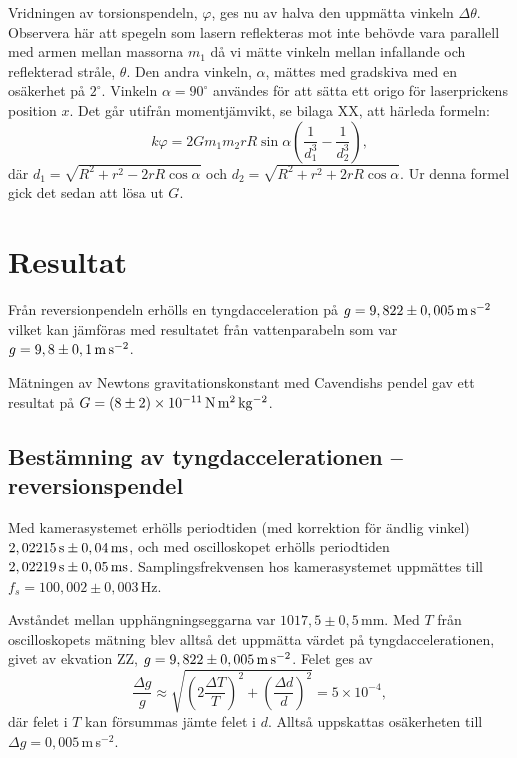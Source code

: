 \documentclass[11pt,a4paper]{article}
\begin{document}
Vridningen av torsionspendeln, $\varphi$, ges nu av halva den uppmätta vinkeln $\Delta \theta$. Observera här att spegeln som lasern reflekteras mot inte behövde vara parallell med armen mellan massorna $m_1$ då vi mätte vinkeln mellan infallande och reflekterad stråle, $\theta$. Den andra vinkeln, $\alpha$, mättes med gradskiva med en osäkerhet på $2^\circ$. Vinkeln $\alpha=90^\circ$ användes för att sätta ett origo för laserprickens position $x$. Det går utifrån momentjämvikt, se bilaga XX, att härleda formeln:
\begin{equation}
k \varphi = 2G m_1 m_2 rR\sin\alpha \left(\frac{1}{d_1^3}-\frac{1}{d_2^3} \right),
\label{eq:Gformel}
\end{equation}
där $d_1=\sqrt{R^2+r^2-2rR\cos\alpha}$ och $d_2=\sqrt{R^2+r^2+2rR\cos\alpha}$. Ur denna formel gick det sedan att lösa ut $G$. 


\section{Resultat}
Från reversionpendeln erhölls en tyngdacceleration på $g=\unit[9,822\pm0,005]{m\,s^{-2}}$ vilket kan jämföras med resultatet från vattenparabeln som var $g=\unit[9,8\pm 0,1]{m\,s^{-2}}$.

Mätningen av Newtons gravitationskonstant med Cavendishs pendel gav ett resultat på 
$G=\unit[(8\pm 2)\times 10^{-11}]{N\,m^2\,kg^{-2}}$.

\subsection{Bestämning av tyngdaccelerationen -- reversionspendel}

Med kamerasystemet erhölls periodtiden (med korrektion för ändlig vinkel) $\unit[2,02215]{s}\pm\unit[0,04]{ms}$, och med oscilloskopet erhölls periodtiden $\unit[2,02219]{s}\pm\unit[0,05]{ms}$.
Samplingsfrekvensen hos kamerasystemet uppmättes till $f_s=100,002\pm0,003$\,Hz.

Avståndet mellan upphängningseggarna var $1017,5\pm 0,5$\,mm. Med $T$ från oscilloskopets mätning blev alltså det uppmätta värdet på tyngdaccelerationen, givet av ekvation ZZ,
$g=\unit[9,822\pm0,005]{m\,s^{-2}}$. Felet ges av
\[ \frac{\Delta g}{g} \approx \sqrt{\left(2\frac{\Delta T}{T}\right)^2 + \left(\frac{\Delta d}{d}\right)^2} = 5\times10^{-4}, \]
där felet i $T$ kan försummas jämte felet i $d$. Alltså uppskattas osäkerheten till $\Delta g=0,005$\,m\,s$^{-2}$.
\end{document}
